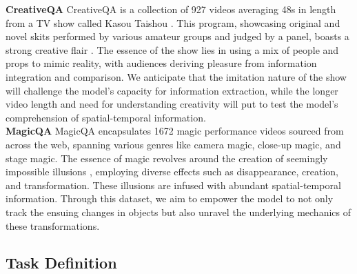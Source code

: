 \noindent\textbf{CreativeQA}\quad 
CreativeQA is a collection of 927 videos averaging 48s in length from a TV show called Kasou Taishou \cite{ntv}. This program, showcasing original and novel skits performed by various amateur groups and judged by a panel, boasts a strong creative flair 
 \cite{runco2012standard}. The essence of the show lies in using a mix of people and props to mimic reality, with audiences deriving pleasure from information integration and comparison. We anticipate that the imitation nature of the show will challenge the model's capacity for information extraction, while the longer video length and need for understanding creativity will put to test the model's comprehension of spatial-temporal information.\\
\noindent\textbf{MagicQA}\quad
MagicQA encapsulates 1672 magic performance videos sourced from across the web, spanning various genres like camera magic, close-up magic, and stage magic. The essence of magic revolves around the creation of seemingly impossible illusions \cite{nelms2012magic}, employing diverse effects such as disappearance, creation, and transformation. These illusions are infused with abundant spatial-temporal information. Through this dataset, we aim to empower the model to not only track the ensuing changes in objects but also unravel the underlying mechanics \cite{lamont2005magic} of these transformations.
\subsection{Task Definition}


